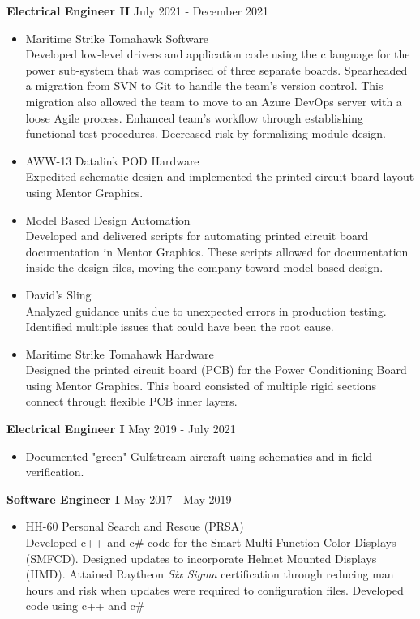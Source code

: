 \documentclass[10pt, letterpaper]{article}
\begin{document}
\textbf{Electrical Engineer II} \hfill July 2021 - December 2021 \\
\vspace{-4ex}
\begin{itemize}[noitemsep]
    \item Maritime Strike Tomahawk Software \\
    Developed low-level drivers and application code using the c language for the power sub-system that was comprised of three separate boards. Spearheaded a migration from SVN to Git to handle the team's version control. This migration also allowed the team to move to an Azure DevOps server with a loose Agile process. Enhanced team's workflow through establishing functional test procedures. Decreased risk by formalizing module design.
    \item AWW-13 Datalink POD Hardware \\
    Expedited schematic design and implemented the printed circuit board layout using Mentor Graphics.
    \item Model Based Design Automation \\
    Developed and delivered scripts for automating printed circuit board documentation in Mentor Graphics. These scripts allowed for documentation inside the design files, moving the company toward model-based design.
    \item David's Sling \\
    Analyzed guidance units due to unexpected errors in production testing. Identified multiple issues that could have been the root cause.
    \item Maritime Strike Tomahawk Hardware \\
    Designed the printed circuit board (PCB) for the Power Conditioning Board using Mentor Graphics. This board consisted of multiple rigid sections connect through flexible PCB inner layers.
\end{itemize}

\textbf{Electrical Engineer I} \hfill May 2019 - July 2021 \\
\vspace{-4ex}
\begin{itemize}
    \item Documented "green" Gulfstream aircraft using schematics and in-field verification.
\end{itemize}


\textbf{Software Engineer I} \hfill May 2017 - May 2019 \\
\vspace{-4ex}
\begin{itemize}[noitemsep]
    \item HH-60 Personal Search and Rescue (PRSA) \\
    Developed c++ and c\# code for the Smart Multi-Function Color Displays (SMFCD). Designed updates to incorporate Helmet Mounted Displays (HMD). Attained Raytheon \emph{Six Sigma} certification through reducing man hours and risk when updates were required to configuration files.
    Developed code using c++ and c\#
\end{itemize}
\end{document}
